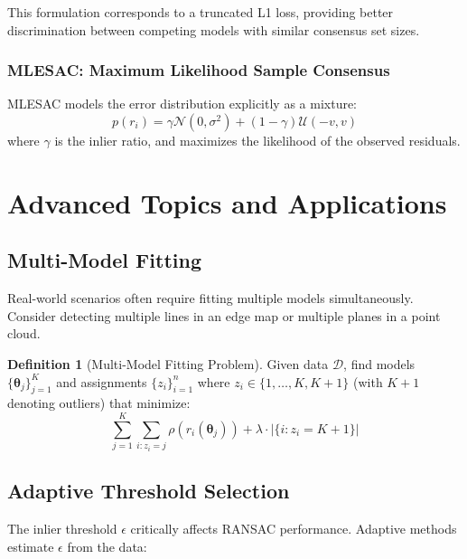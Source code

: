 \documentclass[12pt]{article}
\renewcommand{\vec}[1]{\mathbf{#1}}
\newcommand{\abs}[1]{\left| #1 \right|}
\theoremstyle{definition}
\newtheorem{definition}{Definition}[section]
\begin{document}
This formulation corresponds to a truncated L1 loss, providing better discrimination between competing models with similar consensus set sizes.

\subsubsection{MLESAC: Maximum Likelihood Sample Consensus}

MLESAC models the error distribution explicitly as a mixture:
\begin{equation}
    p(r_i) = \gamma \mathcal{N}(0, \sigma^2) + (1-\gamma) \mathcal{U}(-v, v)
\end{equation}
where $\gamma$ is the inlier ratio, and maximizes the likelihood of the observed residuals.

\newpage
\section{Advanced Topics and Applications}

\subsection{Multi-Model Fitting}

Real-world scenarios often require fitting multiple models simultaneously. Consider detecting multiple lines in an edge map or multiple planes in a point cloud.

\begin{definition}[Multi-Model Fitting Problem]
    Given data $\mathcal{D}$, find models $\{\vec{\theta}_j\}_{j=1}^K$ and assignments $\{z_i\}_{i=1}^n$ where $z_i \in \{1, \ldots, K, K+1\}$ (with $K+1$ denoting outliers) that minimize:
    \begin{equation}
        \sum_{j=1}^K \sum_{i: z_i = j} \rho(r_i(\vec{\theta}_j)) + \lambda \cdot \abs{\{i: z_i = K+1\}}
    \end{equation}
\end{definition}

\subsection{Adaptive Threshold Selection}

The inlier threshold $\epsilon$ critically affects RANSAC performance. Adaptive methods estimate $\epsilon$ from the data:
\end{document}
